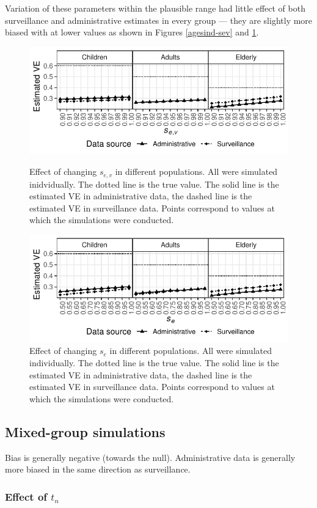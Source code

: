 \documentclass[11pt]{article}
\begin{document}
Variation of these parameters within the plausible range had little effect of both surveillance and administrative estimates in every group --- they are slightly more biased with at lower values as shown in Figures \ref{agesind-sev} and \ref{agesind-spv}.

\begin{figure}[h]
	\centering
		\includegraphics[width=0.75\linewidth]{../fig-agesind/agesind-sens_vac.pdf}
		\caption{
Effect of changing $s_{e,v}$ in different populations. All were simulated inidvidually. The dotted line is the true value. The solid line is the estimated VE in administrative data, the dashed line is the estimated VE in surveillance data. Points correspond to values at which the simulations were conducted. \label{agesind-sev}
		}
		\includegraphics[width=0.75\linewidth]{../fig-agesind/agesind-sens_flu.pdf}
		\caption{
Effect of changing $s_e$ in different populations. All were simulated individually. The dotted line is the true value. The solid line is the estimated VE in administrative data, the dashed line is the estimated VE in surveillance data. Points correspond to values at which the simulations were conducted. \label{agesind-spv}
		}
\end{figure}

\pagebreak
%
\subsection{Mixed-group simulations}

Bias is generally negative (towards the null). Administrative data is generally more biased in the same direction as surveillance.

\subsubsection{Effect of $t_n$}
\end{document}
